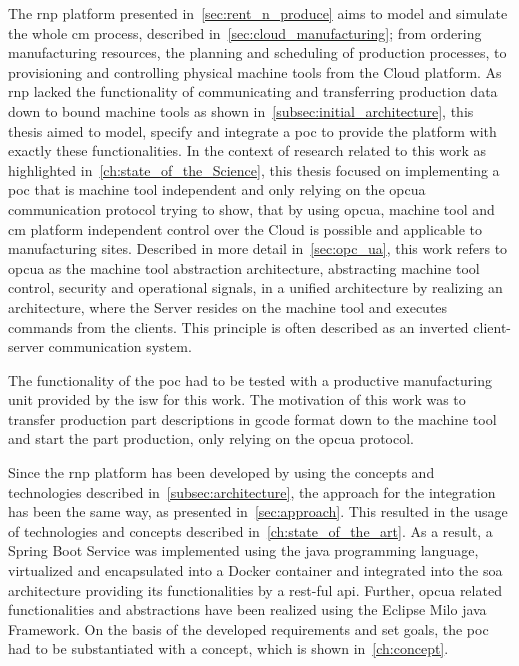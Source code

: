 \documentclass[
a4paper,
twoside,
headsepline,
cleardoublepage=empty,
parskip=half,
draft=false
]{scrbook}
\begin{document}
			The \gls{rnp} platform presented in~\cref{sec:rent_n_produce} aims to model and simulate the whole \gls{cm} process, described in~\cref{sec:cloud_manufacturing}; from ordering manufacturing resources, the planning and scheduling of production processes, to provisioning and controlling physical machine tools from the Cloud platform. As \gls{rnp} lacked the functionality of communicating and transferring production data down to bound machine tools as shown in~\cref{subsec:initial_architecture}, this thesis aimed to model, specify and integrate a \gls{poc} to provide the platform with exactly these functionalities. In the context of research related to this work as highlighted in~\cref{ch:state_of_the_Science}, this thesis focused on implementing a \gls{poc} that is machine tool independent and only relying on the \gls{opcua} communication protocol trying to show, that by using \gls{opcua}, machine tool and \gls{cm} platform independent control over the Cloud is possible and applicable to manufacturing sites. 
			Described in more detail in~\cref{sec:opc_ua}, this work refers to \gls{opcua} as the machine tool abstraction architecture, abstracting machine tool control, security and operational signals, in a unified architecture by realizing an architecture, where the Server resides on the machine tool and executes commands from the clients. This principle is often described as an inverted client-server communication system.
			
			The functionality of the \gls{poc} had to be tested with a productive manufacturing unit provided by the \gls{isw} for this work.
			The motivation of this work was to transfer production part descriptions in \gls{gcode} format down to the machine tool and start the part production, only relying on the \gls{opcua} protocol.
			
			Since the \gls{rnp} platform has been developed by using the concepts and technologies described in~\cref{subsec:architecture}, the approach for the integration has been the same way, as presented in~\cref{sec:approach}. This resulted in the usage of technologies and concepts described in~\cref{ch:state_of_the_art}. As a result, a Spring Boot Service was implemented using the \gls{java} programming language, virtualized and encapsulated into a Docker container and integrated into the \gls{soa} architecture providing its functionalities by a \gls{rest}-ful \gls{api}. Further, \gls{opcua} related functionalities and abstractions have been realized using the Eclipse Milo \gls{java} Framework. 
			On the basis of the developed requirements and set goals, the \gls{poc} had to be substantiated with a concept, which is shown in~\cref{ch:concept}.
		
\end{document}
